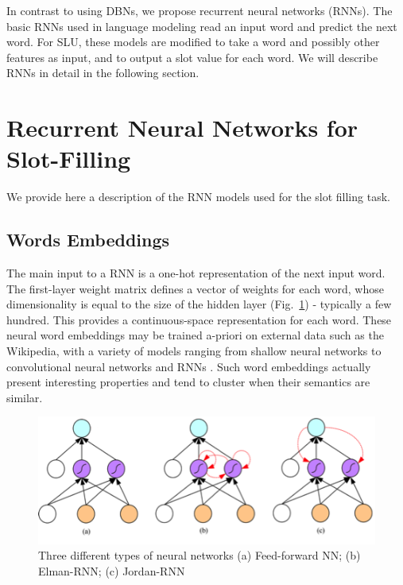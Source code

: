 In contrast to using DBNs, we propose recurrent neural networks (RNNs). The
basic RNNs used in language modeling read an input word and predict the next
word. For SLU, these models are modified to take a word and possibly other
features as input, and to output a slot value for each word. We will describe
RNNs in detail in the following section. 

\section{Recurrent Neural Networks for Slot-Filling}
\label{sec:rnnsf}

We provide here a description of the RNN models used for the slot filling task. 

\subsection{Words Embeddings}

The main input to a RNN is a one-hot representation of the next input word. The
first-layer weight matrix defines a vector of weights for each word, whose
dimensionality is equal to the size of the hidden layer (Fig.~\ref{fig:rnn}) - typically a
few hundred. This provides a continuous-space representation for each word.
These neural word embeddings \citep{rnn26} may be trained a-priori on external data such
as the Wikipedia, with a variety of models ranging from shallow neural networks
\citep{rnn21} to convolutional neural networks \citep{rnn20} and RNNs \citep{rnn22}. Such word embeddings
actually present interesting properties \citep{rnn23} and tend to cluster \citep{rnn20} when
their semantics are similar.

\begin{figure}[t]
\begin{center}
\includegraphics[width=.8\linewidth]{article4/images/rnn.png}
\caption[Forward and Recurrent Neural Networks Architectures]{\label{fig:rnn} Three different types of neural networks 
(a) Feed-forward NN; (b) Elman-RNN; (c) Jordan-RNN}
\vspace{-0.2in}
\end{center}
\vspace*{-1mm}
\end{figure}


